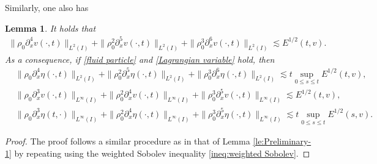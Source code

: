 \documentclass[11pt, reqno]{amsart}
\newtheorem{lemma}{Lemma}
\numberwithin{equation}{section}
\begin{document}
Similarly, one also has
\begin{lemma}\label{le:Preliminary-2} It holds that
	 \begin{align}\label{Preliminary-6}
			\|\rho_0\partial_x^4v(\cdot,t)\|_{L^2(I)}+\|\rho_0^2\partial_x^5v(\cdot,t)\|_{L^2(I)}+\|\rho_0^3\partial_x^6v(\cdot,t)\|_{L^2(I)}\lesssim E^{1/2}(t,v).
	\end{align}
	As a consequence, if \eqref{fluid particle} and \eqref{Lagrangian variable} hold, then
	\begin{align}
			&\|\rho_0\partial_x^4\eta(\cdot,t)\|_{L^2(I)}+\|\rho_0^2\partial_x^5\eta(\cdot,t)\|_{L^2(I)}
			+\|\rho_0^3\partial_x^6\eta(\cdot,t)\|_{L^2(I)}
			\lesssim t\sup_{0\leq s\leq t}E^{1/2}(t,v),\label{Preliminary-7}\\
			&\|\rho_0\partial_x^3v(\cdot,t)\|_{L^\infty(I)}+\|\rho_0^2\partial_x^4v(\cdot,t)\|_{L^\infty(I)}+\|\rho_0^3\partial_x^5v(\cdot,t)\|_{L^\infty(I)}\lesssim E^{1/2}(t,v),\label{Preliminary-8}\\
			&\|\rho_0\partial_x^3\eta(t,\cdot)\|_{L^\infty(I)}
			+\|\rho_0^2\partial_x^4\eta(\cdot,t)\|_{L^\infty(I)}+\|\rho_0^3\partial_x^5\eta(\cdot,t)\|_{L^\infty(I)}\lesssim t\sup_{0\leq s\leq t}E^{1/2}(s,v)\label{Preliminary-9}.
	\end{align}
\end{lemma}
\begin{proof}
	The proof follows a similar procedure as in that of Lemma \ref{le:Preliminary-1} by repeating using the weighted Sobolev inequality \eqref{ineq:weighted Sobolev}.
\end{proof}
\end{document}
